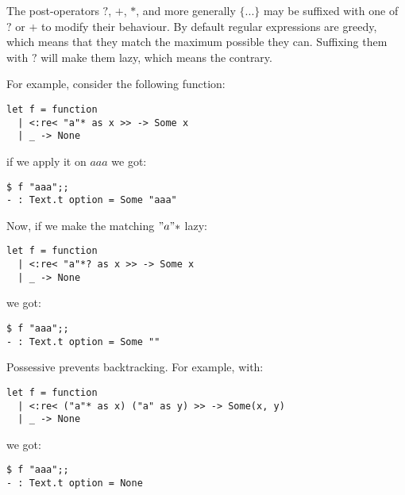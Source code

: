 \documentclass{article}
\begin{document}
The post-operators $?$, $+$, $*$, and more generally $\{...\}$ may be
suffixed with one of $?$ or $+$ to modify their behaviour. By default
regular expressions are greedy, which means that they match the
maximum possible they can. Suffixing them with $?$ will make them
lazy, which means the contrary.

For example, consider the following function:

\begin{verbatim}
let f = function
  | <:re< "a"* as x >> -> Some x
  | _ -> None
\end{verbatim}

if we apply it on $aaa$ we got:

\begin{verbatim}
$ f "aaa";;
- : Text.t option = Some "aaa"
\end{verbatim}

Now, if we make the matching $"a"*$ lazy:

\begin{verbatim}
let f = function
  | <:re< "a"*? as x >> -> Some x
  | _ -> None
\end{verbatim}

we got:

\begin{verbatim}
$ f "aaa";;
- : Text.t option = Some ""
\end{verbatim}

Possessive prevents backtracking. For example, with:

\begin{verbatim}
let f = function
  | <:re< ("a"* as x) ("a" as y) >> -> Some(x, y)
  | _ -> None
\end{verbatim}

we got:

\begin{verbatim}
$ f "aaa";;
- : Text.t option = None
\end{verbatim}
\end{document}
